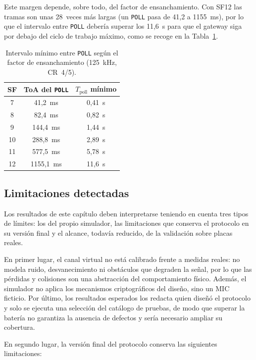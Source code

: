 Este margen depende, sobre todo, del factor de ensanchamiento. Con SF12 las tramas son unas 28~veces más largas (un \texttt{POLL} pasa de 41,2 a 1155~ms), por lo que el intervalo entre \texttt{POLL} debería superar los 11,6~s para que el gateway siga por debajo del ciclo de trabajo máximo, como se recoge en la Tabla~\ref{tab:duty}.

\begin{table}[H]
\centering
\caption{\label{tab:duty} Intervalo mínimo entre \texttt{POLL} según el factor de ensanchamiento (125~kHz, CR~4/5).}
\begin{tabular}{|c|c|c|}
\hline
\textbf{SF} & \textbf{ToA del \texttt{POLL}} & \textbf{$T_{\text{poll}}$ mínimo} \\
\hline
7  & 41,2~ms   & 0,41~s \\ \hline
8  & 82,4~ms   & 0,82~s \\ \hline
9  & 144,4~ms  & 1,44~s \\ \hline
10 & 288,8~ms  & 2,89~s \\ \hline
11 & 577,5~ms  & 5,78~s \\ \hline
12 & 1155,1~ms & 11,6~s \\ \hline
\end{tabular}
\end{table}

\subsection{Limitaciones detectadas}\label{sec:limitaciones-val}

Los resultados de este capítulo deben interpretarse teniendo en cuenta tres tipos de límites: los del propio simulador, las limitaciones que conserva el protocolo en su versión final y el alcance, todavía reducido, de la validación sobre placas reales.

En primer lugar, el canal virtual no está calibrado frente a medidas reales: no modela ruido, desvanecimiento ni obstáculos que degraden la señal, por lo que las pérdidas y colisiones son una abstracción del comportamiento físico. Además, el simulador no aplica los mecanismos criptográficos del diseño, sino un MIC ficticio. Por último, los resultados esperados los redacta quien diseñó el protocolo y solo se ejecuta una selección del catálogo de pruebas, de modo que superar la batería no garantiza la ausencia de defectos y sería necesario ampliar su cobertura.

En segundo lugar, la versión final del protocolo conserva las siguientes limitaciones:

